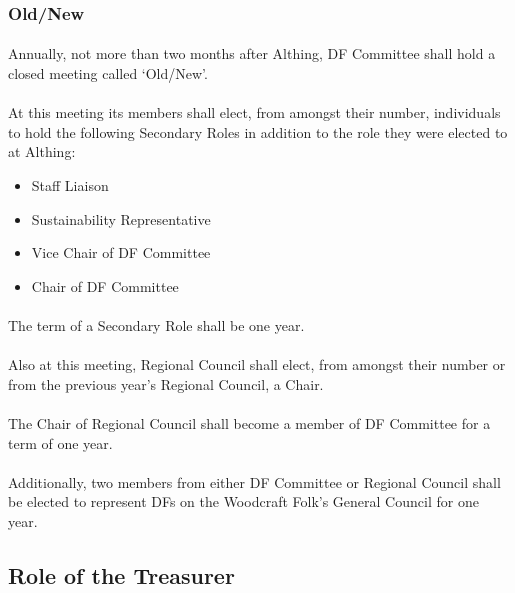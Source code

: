 \documentclass[a4paper, 12pt]{article}
\begin{document}
\subsubsection{Old/New}
\label{sec:oldnew}
\paragraph{} Annually, not more than two months after Althing, DF Committee shall hold a closed meeting called `Old/New'.
\paragraph{} At this meeting its members shall elect, from amongst their number, individuals to hold the following Secondary Roles in addition to the role they were elected to at Althing:
\begin{itemize}
\item Staff Liaison
\item Sustainability Representative
\item Vice Chair of DF Committee
\item Chair of DF Committee
\end{itemize}

\paragraph{} The term of a Secondary Role shall be one year.

\paragraph{} \label{par:rcchair} Also at this meeting, Regional Council shall elect, from amongst their number or from the previous year's Regional Council, a Chair.

\paragraph{} The Chair of Regional Council shall become a member of DF Committee for a term of one year.

\paragraph{} Additionally, two members from either DF Committee or Regional Council shall be elected to represent DFs on the Woodcraft Folk's General Council for one year.

\subsection{Role of the Treasurer}
\label{sec:treasurerrole}
\end{document}
